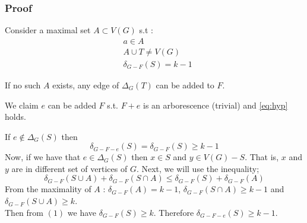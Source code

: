 \documentclass[8pt]{beamer}
\begin{document}
\begin{frame}
\frametitle{Proof}
Consider a maximal set $A\subset V(G)$ s.t :
\begin{subequations}
\begin{align}
    & a \in A \\ 
    & A \cup T \ne V(G) \\ 
    & \delta_{G-F}(S) = k - 1 
\end{align}
\end{subequations}

If no such $A$ exists, any edge of $\Delta_G(T)$ can be added to $F$.

\end{frame}

\begin{frame}


We claim $e$ can be added $F$ s.t. $F + e$ is an arborescence (trivial) and \eqref{eq:hyp} holds.


If $e\not\in \Delta_G(S)$ then $$\delta_{G-F-e}(S) = \delta_{G-F}(S) \ge k-1$$
Now, if we have that $e\in \Delta_G(S)$ then $x\in S$ and $y\in V(G)-S$. That is, $x$ and $y$ are in different set of vertices of $G$. Next, we will use the inequality; 
\begin{equation}\delta_{G-F}(S\cup A) + \delta_{G-F}(S\cap A) \le \delta_{G-F}(S) + \delta_{G-F}(A)\end{equation}
From the maximality of $A$ : $\delta_{G-F}(A)=k-1$, $\delta_{G-F}(S\cap A) \ge k-1$ and $\delta_{G-F}(S\cup A) \ge k$.\\
Then from $(1)$ we have $\delta_{G-F}(S) \ge k$. Therefore $\delta_{G-F-e}(S) \ge k-1$. 
\eofproof
\end{frame}
\end{document}
